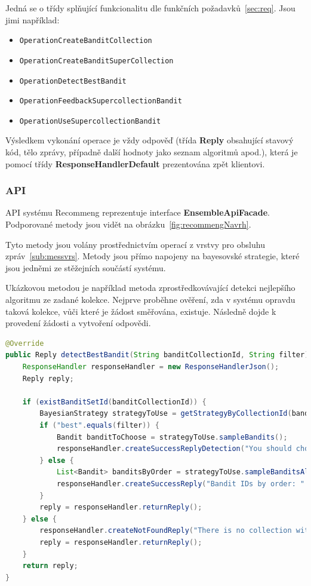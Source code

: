 \documentclass[thesis=M,czech]{FITthesis}[2014/05/07]
\begin{document}
Jedná se o třídy splňující funkcionalitu dle funkčních požadavků~\ref{sec:req}. Jsou jimi například:

\begin{itemize}
	\item \texttt{OperationCreateBanditCollection}
	\item \texttt{OperationCreateBanditSuperCollection}	
	\item \texttt{OperationDetectBestBandit}
	\item \texttt{OperationFeedbackSupercollectionBandit}
	\item \texttt{OperationUseSupercollectionBandit}			
\end{itemize}

Výsledkem vykonání operace je vždy odpověď (třída \textbf{Reply} obsahující stavový kód, tělo zprávy, případně další hodnoty jako seznam algoritmů apod.), která je pomocí třídy \textbf{ResponseHandlerDefault} prezentována zpět klientovi.

\subsubsection{API}
API systému Recommeng reprezentuje interface \textbf{EnsembleApiFacade}. Podporované metody jsou vidět na obrázku~\ref{fig:recommengNavrh}.

Tyto metody jsou volány prostřednictvím operací z vrstvy pro obsluhu zpráv~\ref{sub:messvrs}. Metody jsou přímo napojeny na bayesovské strategie, které jsou jedněmi ze stěžejních součástí systému.

Ukázkovou metodou je například metoda zprostředkovávající detekci nejlepšího algoritmu ze zadané kolekce. Nejprve proběhne ověření, zda v systému opravdu taková kolekce, vůči které je žádost směřována, existuje. Následně dojde k provedení žádosti a vytvoření odpovědi.

\begin{lstlisting}[language=java]
@Override
public Reply detectBestBandit(String banditCollectionId, String filter) {
    ResponseHandler responseHandler = new ResponseHandlerJson();
    Reply reply;

    if (existBanditSetId(banditCollectionId)) {
        BayesianStrategy strategyToUse = getStrategyByCollectionId(banditCollectionId);
        if ("best".equals(filter)) {
            Bandit banditToChoose = strategyToUse.sampleBandits();            
            responseHandler.createSuccessReplyDetection("You should choose bandit with name " + banditToChoose.getName() + " now. He is the best for this context.", banditToChoose.getId(), banditToChoose.getName(), strategyToUse.getId());
        } else {
            List<Bandit> banditsByOrder = strategyToUse.sampleBanditsAll(banditCollectionId);
            responseHandler.createSuccessReply("Bandit IDs by order: " + banditsByOrder.toString());
        }
        reply = responseHandler.returnReply();
    } else {
        responseHandler.createNotFoundReply("There is no collection with ID " + banditCollectionId + " in application.");
        reply = responseHandler.returnReply();
    }
    return reply;
}
\end{lstlisting}
\end{document}
